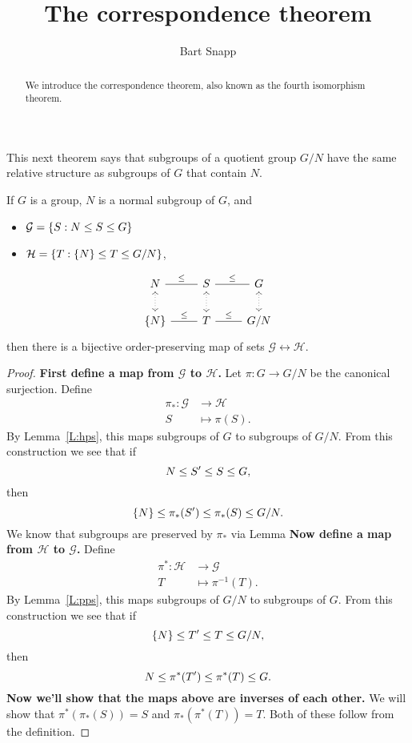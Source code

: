 \documentclass{ximera}
\author{Bart Snapp}
\title{The correspondence theorem}
\begin{document}
\begin{abstract}
  We introduce the correspondence theorem, also known as the fourth
  isomorphism theorem.
\end{abstract}
\maketitle

This next theorem says that subgroups of a quotient group $G/N$ have
the same relative structure as subgroups of $G$ that contain $N$.

\begin{theorem}
  If $G$ is a group, $N$ is a normal subgroup of $G$, and
  \begin{itemize}
  \item $\mathcal{G} = \{S:N\leq S\leq G\}$
  \item $\mathcal{H} = \{T:\{N\}\leq T\leq G/N\}$,
  \end{itemize}
  \[
  \begin{tikzcd}
    N \ar[r,-,"\subgp"] \ar[d,<->,dotted]& S\ar[r,-,"\subgp"] \ar[d,<->,dotted]& G \ar[d,<->,dotted]\\
    \{N\} \ar[r,-,"\subgp"] & T \ar[r,-,"\subgp"] & G/N
  \end{tikzcd}
  \]
  then there is a bijective order-preserving map of sets
  $\mathcal{G}\leftrightarrow\mathcal{H}$.
  \begin{proof}
    \textbf{First define a map from $\pmb{\mathcal{G}}$ to
      $\pmb{\mathcal{H}}$.} Let $\pi:G\to G/N$ be the canonical
    surjection.  Define
    \begin{align*}
    \pi_*:\mathcal{G} &\to \mathcal{H}\\
    S &\mapsto \pi(S).
    \end{align*}
    By Lemma~\ref{L:hps}, this maps subgroups of $G$ to subgroups of
    $G/N$. From this construction we see that if
    \[
    N \leq S'\leq S \leq G,
    \]
    then
    \[
    \{N\}\leq \pi_*(S') \leq \pi_*(S)\leq G/N.
    \]
    We know that subgroups are preserved by $\pi_*$ via Lemma
    \textbf{Now define a map from $\pmb{\mathcal{H}}$ to
      $\pmb{\mathcal{G}}$.}  Define
    \begin{align*}
      \pi^*:\mathcal{H} &\to \mathcal G\\ T &\mapsto
      \pi^{-1}(T).
    \end{align*}
    By Lemma~\ref{L:pps}, this maps subgroups of $G/N$ to subgroups of
    $G$.  From this construction we see that if
    \[
    \{N\} \leq T\hspace{0em}' \leq T \leq G/N,
    \]
    then
    \[
    N \leq \pi^*(T\hspace{0em}')\leq \pi^*(T) \leq G.
    \]
    \textbf{Now we'll show that the maps above are inverses of each
      other.} We will show that $\pi^*(\pi_*(S)) = S$ and
    $\pi_*(\pi^*(T)) = T$. Both of these follow from the
    definition.


\end{proof}
\end{theorem}
\end{document}
